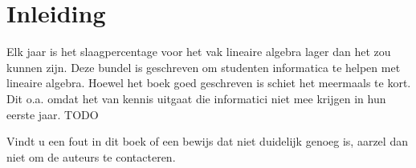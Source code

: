\documentclass[lineaire_algebra_oplossingen.tex]{subfiles}
\begin{document}
\newpage
\section*{Inleiding}
Elk jaar is het slaagpercentage voor het vak lineaire algebra lager dan het zou kunnen zijn. Deze bundel is geschreven om studenten informatica te helpen met lineaire algebra. Hoewel het boek goed geschreven is schiet het meermaals te kort. Dit o.a. omdat het van kennis uitgaat die informatici niet mee krijgen in hun eerste jaar.
TODO

Vindt u een fout in dit boek of een bewijs dat niet duidelijk genoeg is, aarzel dan niet om de auteurs te contacteren.
\end{document}
